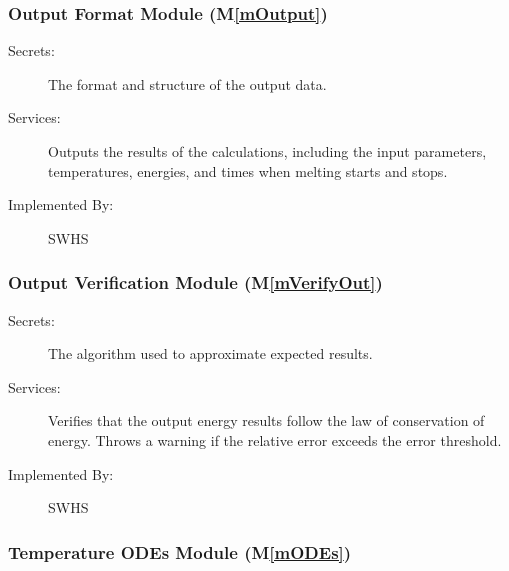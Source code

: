\documentclass[12pt]{article}
\newcommand{\mref}[1]{M\ref{#1}}
\begin{document}


\subsubsection{Output Format Module (\mref{mOutput})}

\begin{description}
\item[Secrets:] The format and structure of the output data.
\item[Services:] Outputs the results of the calculations, including the input
  parameters, temperatures, energies, and times when melting starts and stops.
\item[Implemented By:] SWHS
\end{description} 

\subsubsection{Output Verification Module (\mref{mVerifyOut})}

\begin{description}
\item[Secrets:] The algorithm used to approximate expected results.
\item[Services:] Verifies that the output energy results follow the law of 
  conservation of energy. Throws a warning if the relative error exceeds the
  error threshold.
\item[Implemented By:] SWHS
\end{description}

\subsubsection{Temperature ODEs Module (\mref{mODEs})}
\end{document}
